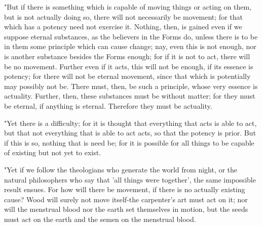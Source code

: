 "But if there is something which is capable of moving things or acting
on them, but is not actually doing so, there will not necessarily
be movement; for that which has a potency need not exercise it. Nothing,
then, is gained even if we suppose eternal substances, as the believers
in the Forms do, unless there is to be in them some principle which
can cause change; nay, even this is not enough, nor is another substance
besides the Forms enough; for if it is not to act, there will be no
movement. Further even if it acts, this will not be enough, if its
essence is potency; for there will not be eternal movement, since
that which is potentially may possibly not be. There must, then, be
such a principle, whose very essence is actuality. Further, then,
these substances must be without matter; for they must be eternal,
if anything is eternal. Therefore they must be actuality.

"Yet there is a difficulty; for it is thought that everything that
acts is able to act, but that not everything that is able to act acts,
so that the potency is prior. But if this is so, nothing that is need
be; for it is possible for all things to be capable of existing but
not yet to exist. 

"Yet if we follow the theologians who generate the world from night,
or the natural philosophers who say that 'all things were together',
the same impossible result ensues. For how will there be movement,
if there is no actually existing cause? Wood will surely not move
itself-the carpenter's art must act on it; nor will the menstrual
blood nor the earth set themselves in motion, but the seeds must act
on the earth and the semen on the menstrual blood. 

